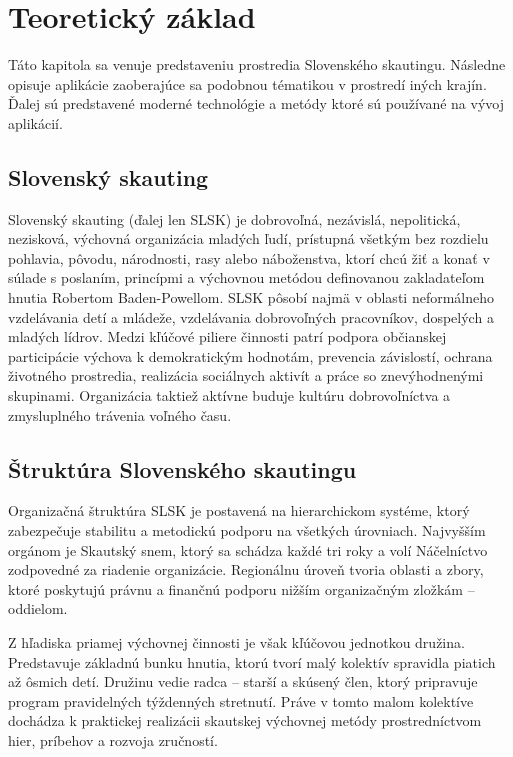 \chapter{Teoretický základ}
\begin{chapterabstract}
Táto kapitola sa venuje predstaveniu prostredia Slovenského skautingu. Následne opisuje aplikácie zaoberajúce sa podobnou tématikou v prostredí iných krajín. Ďalej sú predstavené moderné technológie a metódy ktoré sú používané na vývoj aplikácií.
\end{chapterabstract}

\section{Slovenský skauting}
Slovenský skauting (ďalej len SLSK) je dobrovoľná, nezávislá, nepolitická, nezisková, výchovná organizácia mladých ľudí, prístupná všetkým bez rozdielu pohlavia, pôvodu, národnosti, rasy alebo náboženstva, ktorí chcú žiť a konať v súlade s poslaním, princípmi a výchovnou metódou definovanou zakladateľom hnutia Robertom Baden-Powellom. 
SLSK pôsobí najmä v oblasti neformálneho vzdelávania detí a mládeže, vzdelávania dobrovoľných pracovníkov, dospelých a mladých lídrov. Medzi kľúčové piliere činnosti patrí podpora občianskej participácie výchova k demokratickým hodnotám, prevencia závislostí, ochrana životného prostredia, realizácia sociálnych aktivít a práce so znevýhodnenými skupinami. Organizácia taktiež aktívne buduje kultúru dobrovoľníctva a zmysluplného trávenia voľného času.
\cite{noauthor_vyrocna_nodate}

\section{Štruktúra Slovenského skautingu}
Organizačná štruktúra SLSK je postavená na hierarchickom systéme, ktorý zabezpečuje stabilitu a metodickú podporu na všetkých úrovniach. Najvyšším orgánom je Skautský snem, ktorý sa schádza každé tri roky a volí Náčelníctvo zodpovedné za riadenie organizácie. Regionálnu úroveň tvoria oblasti a zbory, ktoré poskytujú právnu a finančnú podporu nižším organizačným zložkám – oddielom.

Z hľadiska priamej výchovnej činnosti je však kľúčovou jednotkou družina. Predstavuje základnú bunku hnutia, ktorú tvorí malý kolektív spravidla piatich až ôsmich detí. Družinu vedie radca – starší a skúsený člen, ktorý pripravuje program pravidelných týždenných stretnutí. Práve v tomto malom kolektíve dochádza k praktickej realizácii skautskej výchovnej metódy prostredníctvom hier, príbehov a rozvoja zručností.
\cite{struktura_skautingu}

